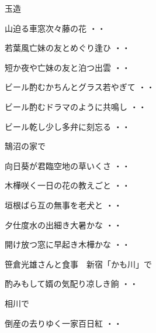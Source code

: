 \vspace{0.6cm}
玉造
\begin{shiika}山迫る車窓次々藤の花
\hfill{・・}\end{shiika}
\begin{shiika}若葉風亡妹の友とめぐり逢ひ
\hfill{・・}\end{shiika}
\begin{shiika}短か夜や亡妹の友と泊つ出雲
\hfill{・・}\end{shiika}
\begin{shiika}ビール酌むかちんとグラス若やぎて
\hfill{・・}\end{shiika}
\begin{shiika}ビール酌むドラマのように共鳴し
\hfill{・・}\end{shiika}
\begin{shiika}ビール乾し少し多弁に刻忘る
\hfill{・・}\end{shiika}
\vspace{0.6cm}
鵠沼の家で
\begin{shiika}向日葵が君臨空地の草いくさ
\hfill{・・}\end{shiika}
\begin{shiika}木樺咲く一日の花の教えごと
\hfill{・・}\end{shiika}
\begin{shiika}垣根ばら互の無事を老犬と
\hfill{・・}\end{shiika}
\begin{shiika}夕仕度水の出細き大暑かな
\hfill{・・}\end{shiika}
\begin{shiika}開け放つ窓に早起き木樺かな
\hfill{・・}\end{shiika}
\vspace{0.6cm}
笹倉光雄さんと食事　新宿「かも川」で
\begin{shiika}酌みもして婿の気配り凉しき餉
\hfill{・・}\end{shiika}
\vspace{0.6cm}
相川で
\begin{shiika}倒産の去りゆく一家百日紅
\hfill{・・}\end{shiika}
